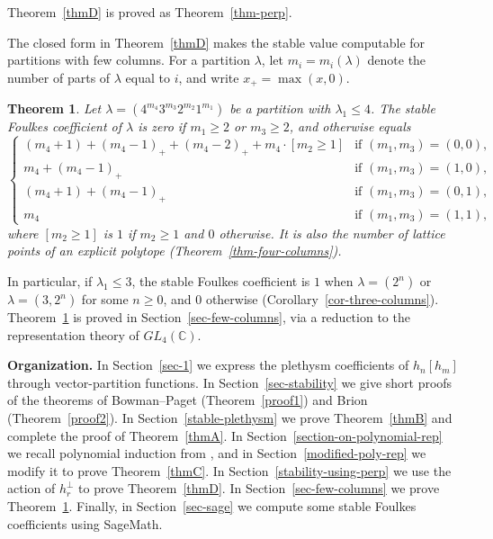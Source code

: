 \documentclass[reqno]{amsart}
\theoremstyle{plain}
\theoremstyle{definition}
\theoremstyle{remark}
\theoremstyle{plain}
\newtheorem{thmx}{Theorem}
\newcommand{\C}{\mathbb{C}}
\begin{document}
\noindent Theorem~\ref{thmD} is proved as Theorem~\ref{thm-perp}.

The closed form in Theorem~\ref{thmD} makes the stable value computable for
partitions with few columns. For a partition $\lambda$, let $m_i=m_i(\lambda)$
denote the number of parts of $\lambda$ equal to $i$, and write
$x_+=\max(x,0)$.

\begin{thmx}\label{thmE}
Let $\lambda=(4^{m_4}3^{m_3}2^{m_2}1^{m_1})$ be a partition with
$\lambda_1\le4$. The stable Foulkes coefficient of $\lambda$ is zero if
$m_1\ge2$ or $m_3\ge2$, and otherwise equals
$$
\begin{cases}
(m_4+1)+(m_4-1)_++(m_4-2)_++m_4\cdot[m_2\ge1] & \text{if } (m_1,m_3)=(0,0),\\[4pt]
m_4+(m_4-1)_+ & \text{if } (m_1,m_3)=(1,0),\\[4pt]
(m_4+1)+(m_4-1)_+ & \text{if } (m_1,m_3)=(0,1),\\[4pt]
m_4 & \text{if } (m_1,m_3)=(1,1),
\end{cases}
$$
where $[m_2\ge1]$ is $1$ if $m_2\ge1$ and $0$ otherwise. It is also the number
of lattice points of an explicit polytope (Theorem~\ref{thm-four-columns}).
\end{thmx}

\noindent In particular, if $\lambda_1\le3$, the stable Foulkes coefficient is
$1$ when $\lambda=(2^n)$ or $\lambda=(3,2^n)$ for some $n\ge0$, and $0$
otherwise (Corollary~\ref{cor-three-columns}). Theorem~\ref{thmE} is proved in
Section~\ref{sec-few-columns}, via a reduction to the representation theory
of $GL_4(\C)$.

\medskip
\noindent\textbf{Organization.} In Section~\ref{sec-1} we express the
plethysm coefficients of $h_n[h_m]$ through vector-partition functions. In
Section~\ref{sec-stability} we give short proofs of the theorems of
Bowman--Paget (Theorem~\ref{proof1}) and Brion (Theorem~\ref{proof2}). In
Section~\ref{stable-plethysm} we prove Theorem~\ref{thmB} and complete the
proof of Theorem~\ref{thmA}. In Section~\ref{section-on-polynomial-rep} we
recall polynomial induction from \cite{narayanan}, and in
Section~\ref{modified-poly-rep} we modify it to prove Theorem~\ref{thmC}. In
Section~\ref{stability-using-perp} we use the action of $h_r^\perp$ to prove
Theorem~\ref{thmD}. In Section~\ref{sec-few-columns} we prove
Theorem~\ref{thmE}. Finally, in Section~\ref{sec-sage} we compute some stable
Foulkes coefficients using SageMath.
\end{document}
